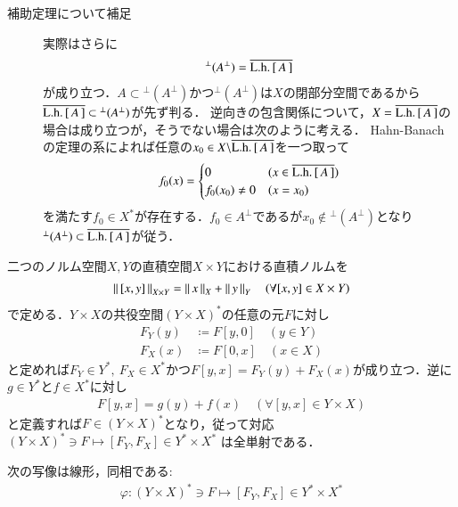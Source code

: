	\begin{description}
		\item[補助定理について補足]
			実際はさらに
			\begin{align}
				{}^{\perp}(A^{\perp}) = \overline{\mathrm{L.h.}\left[\, A\, \right]}
			\end{align}
			が成り立つ．$A \subset {}^{\perp}(A^{\perp})$かつ${}^{\perp}(A^{\perp})$は$X$の閉部分空間であるから
			$\overline{\mathrm{L.h.}\left[\, A\, \right]} \subset {}^{\perp}(A^{\perp})$が先ず判る．
			逆向きの包含関係について，$X = \overline{\mathrm{L.h.}\left[\, A\, \right]}$の場合は成り立つが，そうでない場合は次のように考える．
			Hahn-Banachの定理の系によれば任意の$x_0 \in X \backslash \overline{\mathrm{L.h.}\left[\, A\, \right]}$を一つ取って
			\begin{align}
				f_0(x) = 
				\begin{cases}
					0 & (x \in \overline{\mathrm{L.h.}\left[\, A\, \right]}) \\
					f_0(x_0) \neq 0 & (x = x_0)
				\end{cases}
			\end{align}
			を満たす$f_0 \in X^*$が存在する．$f_0 \in A^{\perp}$であるが$x_0 \notin {}^{\perp}(A^{\perp})$となり
			${}^{\perp}(A^{\perp}) \subset \overline{\mathrm{L.h.}\left[\, A\, \right]}$が従う．
			\QED
	\end{description}
	
	二つのノルム空間$X,Y$の直積空間$X \times Y$における直積ノルムを
	\begin{align}
		\left\|\, [x,y]\, \right\|_{X \times Y} = \left\|\, x\, \right\|_{X} + \left\|\, y\, \right\|_{Y} \quad (\forall [x,y] \in X \times Y)
	\end{align}
	で定める．$Y \times X$の共役空間$(Y \times X)^*$の任意の元$F$に対し
	\begin{align}
		F_Y(y) &\coloneqq F[y,0] \quad (y \in Y) \\
		F_X(x) &\coloneqq F[0,x] \quad (x \in X) \label{eq:thm_T_star_closed_1}
	\end{align}
	と定めれば$F_Y \in Y^*,\ F_X \in X^*$かつ$F[y,x] = F_Y(y) + F_X(x)$が成り立つ．逆に$g \in Y^*$と$f \in X^*$に対し
	\begin{align}
		F[y,x] = g(y) + f(x) \quad (\forall [y,x] \in Y \times X)
	\end{align}
	と定義すれば$F \in (Y \times X)^*$となり，従って対応$(Y \times X)^* \ni F \longmapsto [F_Y,F_X] \in Y^* \times X^*$
	は全単射である．
	\begin{screen}
		\begin{lem}
			次の写像は線形，同相である:
			\begin{align}
				\varphi : (Y \times X)^* \ni F \longmapsto [F_Y,F_X] \in Y^* \times X^*
			\end{align}
			\label{lem:T_star_closed_2}
		\end{lem}
	\end{screen}
	
